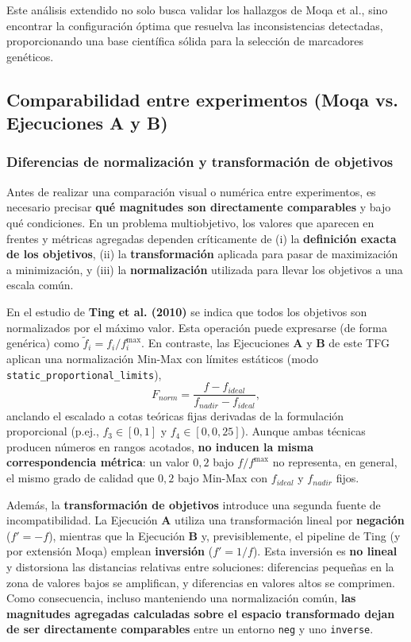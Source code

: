 \documentclass[a4paper,10pt]{article}
\begin{document}
Este análisis extendido no solo busca validar los hallazgos de Moqa et al., sino encontrar la configuración óptima que resuelva las inconsistencias detectadas, proporcionando una base científica sólida para la selección de marcadores genéticos.

\subsection{Comparabilidad entre experimentos (Moqa vs. Ejecuciones A y B)}
\label{sec:comparabilidad_3_2}

\subsubsection{Diferencias de normalización y transformación de objetivos}

Antes de realizar una comparación visual o numérica entre experimentos, es necesario precisar \textbf{qué magnitudes son directamente comparables} y bajo qué condiciones. En un problema multiobjetivo, los valores que aparecen en frentes y métricas agregadas dependen críticamente de (i) la \textbf{definición exacta de los objetivos}, (ii) la \textbf{transformación} aplicada para pasar de maximización a minimización, y (iii) la \textbf{normalización} utilizada para llevar los objetivos a una escala común.

En el estudio de \textbf{Ting et al. (2010)} se indica que \guillemotleft todos los objetivos son normalizados por el máximo valor\guillemotright. Esta operación puede expresarse (de forma genérica) como $\tilde{f}_i = f_i / f_i^{\max}$. En contraste, las Ejecuciones \textbf{A} y \textbf{B} de este TFG aplican una normalización Min-Max con límites estáticos (modo \texttt{static\_proportional\_limits}),
\begin{equation}
F_{norm} = \frac{f - f_{ideal}}{f_{nadir} - f_{ideal}},
\end{equation}
anclando el escalado a cotas teóricas fijas derivadas de la formulación proporcional (p.ej., $f_3 \in [0,1]$ y $f_4 \in [0,0{,}25]$). Aunque ambas técnicas producen números en rangos acotados, \textbf{no inducen la misma correspondencia métrica}: un valor $0{,}2$ bajo $f/f^{\max}$ no representa, en general, el mismo grado de calidad que $0{,}2$ bajo Min-Max con $f_{ideal}$ y $f_{nadir}$ fijos.

Además, la \textbf{transformación de objetivos} introduce una segunda fuente de incompatibilidad. La Ejecución \textbf{A} utiliza una transformación lineal por \textbf{negación} ($f'=-f$), mientras que la Ejecución \textbf{B} y, previsiblemente, el pipeline de Ting (y por extensión Moqa) emplean \textbf{inversión} ($f'=1/f$). Esta inversión es \textbf{no lineal} y distorsiona las distancias relativas entre soluciones: diferencias pequeñas en la zona de valores bajos se amplifican, y diferencias en valores altos se comprimen. Como consecuencia, incluso manteniendo una normalización común, \textbf{las magnitudes agregadas calculadas sobre el espacio transformado dejan de ser directamente comparables} entre un entorno \texttt{neg} y uno \texttt{inverse}.
\end{document}
